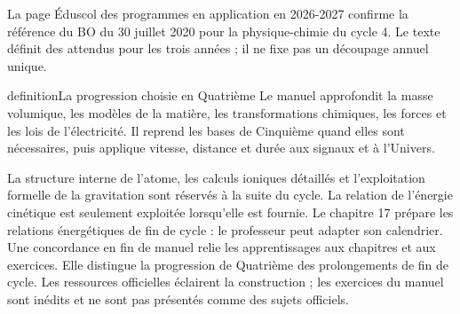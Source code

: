 \vspace{3mm}
\endgroup
\clearpage{}
La page Éduscol des programmes en application en 2026-2027 confirme la référence du BO du 30 juillet 2020 pour la physique-chimie du cycle 4. Le texte définit des attendus pour les trois années ; il ne fixe pas un découpage annuel unique.
\begin{pcEncadre}{definition}{La progression choisie en Quatrième}
Le manuel approfondit la masse volumique, les modèles de la matière, les transformations chimiques, les forces et les lois de l’électricité. Il reprend les bases de Cinquième quand elles sont nécessaires, puis applique vitesse, distance et durée aux signaux et à l’Univers.
\end{pcEncadre}
La structure interne de l’atome, les calculs ioniques détaillés et l’exploitation formelle de la gravitation sont réservés à la suite du cycle. La relation de l’énergie cinétique est seulement exploitée lorsqu’elle est fournie. Le chapitre 17 prépare les relations énergétiques de fin de cycle : le professeur peut adapter son calendrier.
Une concordance en fin de manuel relie les apprentissages aux chapitres et aux exercices. Elle distingue la progression de Quatrième des prolongements de fin de cycle. Les ressources officielles éclairent la construction ; les exercices du manuel sont inédits et ne sont pas présentés comme des sujets officiels.
